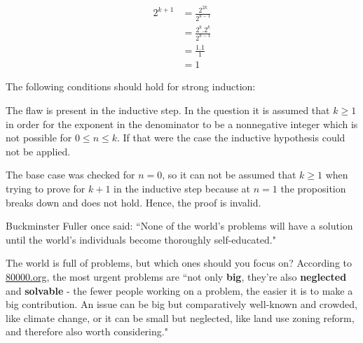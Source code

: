 \documentclass[addpoints]{exam}
\begin{document}
\begin{questions}
\begin{parts}
  \begin{align*}
      2^{k+1} &= \frac{2^{2k}}{2^{k-1}}\\
      &= \frac{2^k.2^k}{2^{k-1}}\\
      &= \frac{1.1}{1}\\
      &= 1
  \end{align*}

  \begin{solution}
    The following conditions should hold for strong induction:
    The flaw is present in the inductive step. In the question it is assumed that $k \geq 1$ in order for the exponent in the denominator to be a nonnegative integer which is not possible for $0 \leq n \leq k$. If that were the case the inductive hypothesis could not be applied. 
    
    The base case was checked for $n=0$, so it can not be assumed that $k\geq 1$ when trying to prove for $k+1$ in the inductive step because at $n=1$ the proposition breaks down and does not hold. Hence, the proof is invalid. 
  \end{solution}
\end{parts}

\question Buckminster Fuller once said: ``None of the world’s problems will have a solution until the world’s individuals become thoroughly self-educated."

The world is full of problems, but which ones should you focus on? According to \href{http://8000hours.org}{80000.org}, the most urgent problems are ``not only \textbf{big}, they're also \textbf{neglected} and \textbf{solvable} - the fewer people working on a problem, the easier it is to make a big contribution. An issue can be big but comparatively well-known and crowded, like climate change, or it can be small but neglected, like land use zoning reform, and therefore also worth considering."


\end{questions}
\end{document}
